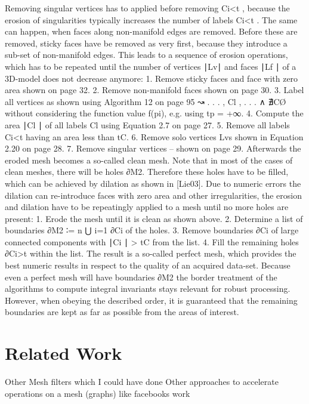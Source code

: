 \documentclass{article}
\begin{document}
Removing singular vertices has to applied before removing Ci<t , because the erosion of singularities typically increases the number of labels Ci<t . The same can happen, when faces along non-manifold edges are removed. Before these are removed, sticky faces have be removed as very first, because they introduce a sub-set of non-manifold edges. This leads to a sequence of erosion operations, which has to be repeated until the number of vertices ∣Lv∣ and faces ∣Lf ∣ of a 3D-model does not decrease anymore:
1. Remove sticky faces and face with zero area shown on page 32.
2. Remove non-manifold faces shown on page 30.
3. Label all vertices as shown using Algorithm 12 on page 95 ↝ {. . . , Cl , . . . } ∧ ∄CØ without considering the function value f(pi), e.g. using tp = +∞.
4. Compute the area ∣Cl ∣ of all labels Cl using Equation 2.7 on page 27.
5. Remove all labels Ci<t having an area less than tC.
6. Remove solo vertices Lvs shown in Equation 2.20 on page 28.
7. Remove singular vertices – shown on page 29.
Afterwards the eroded mesh becomes a so-called clean mesh. Note that in most of the cases of clean meshes, there will be holes ∂M2. Therefore these holes have to be filled, which can be achieved by dilation as shown in [Lie03]. Due to numeric errors the dilation can re-introduce faces with zero area and other irregularities, the erosion and dilation have to be repeatingly applied to a mesh until no more holes are present:
1. Erode the mesh until it is clean as shown above.
2. Determine a list of boundaries ∂M2 ∶= n ⋃ i=1 ∂Ci of the holes.
3. Remove boundaries ∂Ci of large connected components with ∣Ci ∣ > tC from the list.
4. Fill the remaining holes ∂Ci>t within the list.
The result is a so-called perfect mesh, which provides the best numeric results in respect to the quality of an acquired data-set. Because even a perfect mesh will have boundaries ∂M2 the border treatment of the algorithms to compute integral invariants stays relevant for robust processing. However, when obeying the described order, it is guaranteed that the remaining boundaries are kept as far as possible from the areas of interest.~\cite[p.~120]{Mara12}
\section{Related Work}
Other Mesh filters which I could have done
Other approaches to accelerate operations on a mesh
(graphs) like facebooks work
\end{document}
